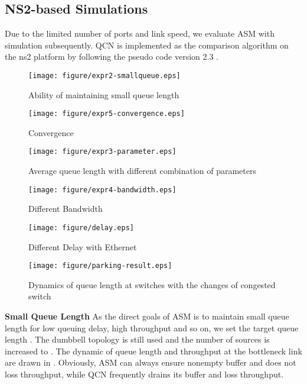 \documentclass{sig-alternate-10pt}
\begin{document}
\subsection{NS2-based Simulations}
Due to the limited number of ports and link speed, we evaluate ASM with simulation subsequently. QCN is implemented as the comparison algorithm on the ns2 platform by following the pseudo code version 2.3 .
\begin{figure*}
\begin{minipage}{0.33\textwidth}
\centering
\texttt{[image: figure/expr2-smallqueue.eps]}
\caption{Ability of maintaining small queue length}
\label{small-queue}
\end{minipage}
\vspace{0.1cm}
\begin{minipage}{0.33\textwidth}
\centering
\texttt{[image: figure/expr5-convergence.eps]}
\caption{Convergence}
\label{convergence}
\end{minipage}
\vspace{0.1cm}
\begin{minipage}{0.33\textwidth}
\centering
\texttt{[image: figure/expr3-parameter.eps]}
\caption{Average queue length with different combination of parameters}
\label{parameter}
\end{minipage}
\end{figure*}
\begin{figure*}
\begin{minipage}{0.33\textwidth}
\centering
\texttt{[image: figure/expr4-bandwidth.eps]}
\caption{Different Bandwidth}
\label{bandwidth}
\end{minipage}
\vspace{0.1cm}
\begin{minipage}{0.33\textwidth}
\centering
\texttt{[image: figure/delay.eps]}
\caption{Different Delay with  Ethernet}
\label{delay}
\end{minipage}
\vspace{0.1cm}
\begin{minipage}{0.33\textwidth}
\centering
\texttt{[image: figure/parking-result.eps]}
\caption{Dynamics of queue length at switches with the changes of congested switch}
\label{park-result}
\end{minipage}
\end{figure*}
\textbf{Small Queue Length}
As the direct goals of ASM is to maintain small queue length for low queuing delay, high throughput and so on, we set the target queue length . The dumbbell topology is still used and the number of sources is increased to . The dynamic of queue length and throughput at the bottleneck link are drawn in . Obviously, ASM can always ensure nonempty buffer and does not loss throughput, while QCN frequently drains its buffer and loss throughput.  \\
\end{document}
